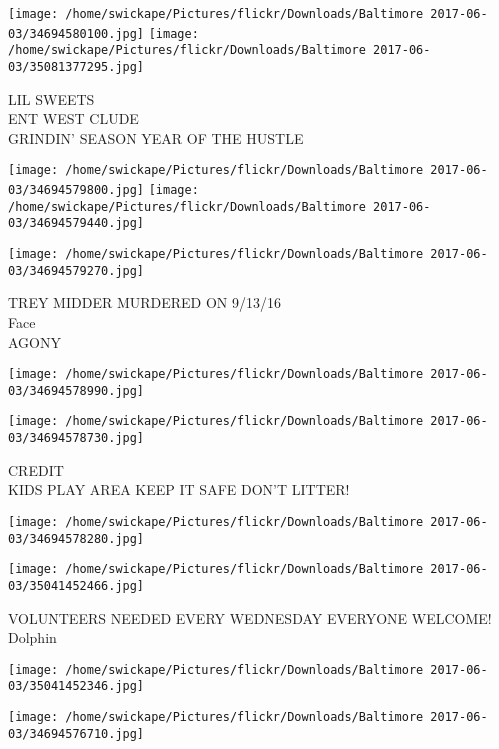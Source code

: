 \documentclass[10pt,letterpaper]{article}
\begin{document}
\vspace{0.25in}
\texttt{[image: /home/swickape/Pictures/flickr/Downloads/Baltimore 2017-06-03/34694580100.jpg]}
\texttt{[image: /home/swickape/Pictures/flickr/Downloads/Baltimore 2017-06-03/35081377295.jpg]}

LIL SWEETS\\
ENT WEST CLUDE\\
GRINDIN' SEASON YEAR OF THE HUSTLE\\
\pagebreak

\texttt{[image: /home/swickape/Pictures/flickr/Downloads/Baltimore 2017-06-03/34694579800.jpg]}
\texttt{[image: /home/swickape/Pictures/flickr/Downloads/Baltimore 2017-06-03/34694579440.jpg]}

\texttt{[image: /home/swickape/Pictures/flickr/Downloads/Baltimore 2017-06-03/34694579270.jpg]}

TREY MIDDER MURDERED ON 9/13/16\\
Face\\
AGONY\\
\pagebreak

\texttt{[image: /home/swickape/Pictures/flickr/Downloads/Baltimore 2017-06-03/34694578990.jpg]}

\vspace{0.25in}
\texttt{[image: /home/swickape/Pictures/flickr/Downloads/Baltimore 2017-06-03/34694578730.jpg]}

CREDIT\\
KIDS PLAY AREA KEEP IT SAFE DON'T LITTER!\\
\pagebreak

\texttt{[image: /home/swickape/Pictures/flickr/Downloads/Baltimore 2017-06-03/34694578280.jpg]}

\vspace{0.25in}
\texttt{[image: /home/swickape/Pictures/flickr/Downloads/Baltimore 2017-06-03/35041452466.jpg]}

VOLUNTEERS NEEDED EVERY WEDNESDAY EVERYONE WELCOME!\\
Dolphin\\
\pagebreak

\texttt{[image: /home/swickape/Pictures/flickr/Downloads/Baltimore 2017-06-03/35041452346.jpg]}

\vspace{0.25in}
\texttt{[image: /home/swickape/Pictures/flickr/Downloads/Baltimore 2017-06-03/34694576710.jpg]}
\end{document}
